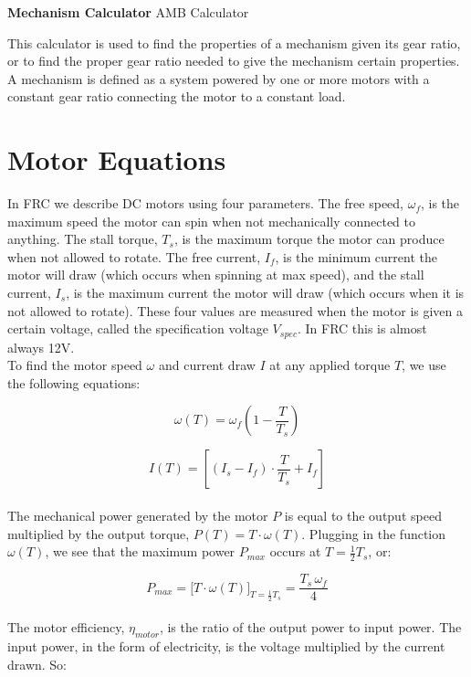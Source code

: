 \documentclass[a4paper]{article}
\begin{document}
	
	\Huge\textbf{Mechanism Calculator}
	\newline
	\LARGE AMB Calculator
	
	\vspace{0.5cm}
	\normalsize
	
	This calculator is used to find the properties of a mechanism given its gear ratio, or to find the proper gear ratio needed to give the mechanism certain properties. A mechanism is defined as a system powered by one or more motors with a constant gear ratio connecting the motor to a constant load. 
	
	\section*{Motor Equations}
	
	In FRC we describe DC motors using four parameters. The free speed, $ \omega_f $, is the maximum speed the motor can spin when not mechanically connected to anything. The stall torque, $ T_s $, is the maximum torque the motor can produce when not allowed to rotate. The free current, $ I_f $, is the minimum current the motor will draw (which occurs when spinning at max speed), and the stall current, $ I_s $, is the maximum current the motor will draw (which occurs when it is not allowed to rotate). These four values are measured when the motor is given a certain voltage, called the specification voltage $ V_{spec} $. In FRC this is almost always 12V. \\
	
	To find the motor speed $ \omega $ and current draw $ I $ at any applied torque $ T $, we use the following equations:
	
	\begin{equation} \label{w(T)}
		\omega (T) = \omega_f \left( 1 - \frac{T}{T_s} \right)
	\end{equation}
	
	\begin{equation} \label{I(T)}
		I (T) = \left[ \left( I_s - I_f \right) \cdot \frac{T}{T_s} + I_f \right]
	\end{equation}
	\\
	The mechanical power generated by the motor $ P $ is equal to the output speed multiplied by the output torque, $ P(T) = T \cdot \omega (T) $. Plugging in the function $ \omega (T) $, we see that the maximum power $ P_{max} $ occurs at $ T = \frac{1}{2} T_s $, or:
	
	\begin{equation}
		P_{max} = \Big[ T \cdot \omega(T) \Big]_{T = \frac{1}{2} T_s} = \frac{T_s\, \omega_f}{4}
	\end{equation}
	\\
	The motor efficiency, $ \eta_{motor} $, is the ratio of the output power to input power. The input power, in the form of electricity, is the voltage multiplied by the current drawn. So:
	
\end{document}
